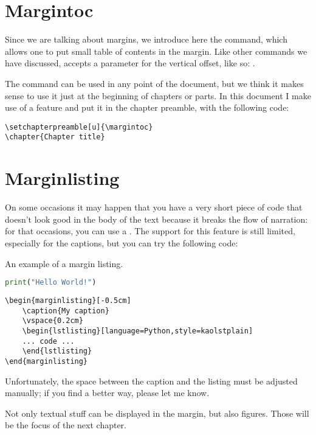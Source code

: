 \section{Margintoc}

Since we are talking about margins, we introduce here the 
 command, which allows one to put small table of 
contents in the margin. Like other commands we have discussed, 
 accepts a parameter for the vertical offset, like 
so: .

The command can be used in any point of the document, but we think it 
makes sense to use it just at the beginning of chapters or parts. In 
this document I make use of a \KOMAScript\xspace feature and put it in 
the chapter preamble, with the following code:


\begin{lstlisting}[style=kaolstplain]
\setchapterpreamble[u]{\margintoc}
\chapter{Chapter title}
\end{lstlisting}

\section{Marginlisting}

On some occasions it may happen that you have a very short piece of code 
that doesn't look good in the body of the text because it breaks the 
flow of narration: for that occasions, you can use a 
. The support for this feature is still 
limited, especially for the captions, but you can try the following 
code:

\begin{marginlisting}[-1.35cm]
	\caption{An example of a margin listing.}
	\vspace{0.6cm}
	\begin{lstlisting}[language=Python,style=kaolstplain]
print("Hello World!")
	\end{lstlisting}
\end{marginlisting}

\begin{verbatim}
\begin{marginlisting}[-0.5cm]
	\caption{My caption}
	\vspace{0.2cm}
	\begin{lstlisting}[language=Python,style=kaolstplain]
	... code ...
	\end{lstlisting}
\end{marginlisting}
\end{verbatim}

Unfortunately, the space between the caption and the listing must be 
adjusted manually; if you find a better way, please let me know.

Not only textual stuff can be displayed in the margin, but also figures. 
Those will be the focus of the next chapter.
